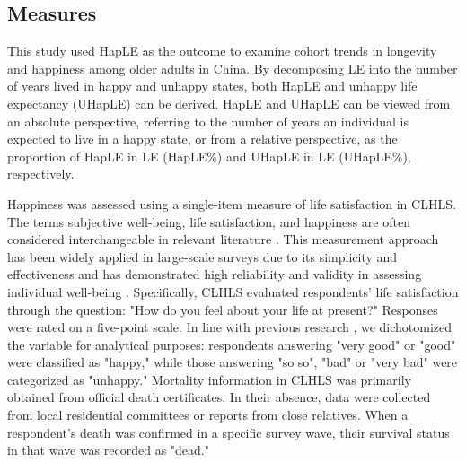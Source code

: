 \documentclass[12pt, a4paper]{article}
\begin{document}
\subsection{Measures}
This study used HapLE as the outcome to examine cohort trends in longevity and happiness among older adults in China. By decomposing LE into the number of years lived in happy and unhappy states, both HapLE and unhappy life expectancy (UHapLE) can be derived. HapLE and UHapLE can be viewed from an absolute perspective, referring to the number of years an individual is expected to live in a happy state, or from a relative perspective, as the proportion of HapLE in LE (HapLE\%) and UHapLE in LE (UHapLE\%), respectively.

Happiness was assessed using a single-item measure of life satisfaction in CLHLS. The terms subjective well-being, life satisfaction, and happiness are often considered interchangeable in relevant literature \autocite{easterlin.2021.growth,yang.2008.long}. This measurement approach has been widely applied in large-scale surveys due to its simplicity and effectiveness and has demonstrated high reliability and validity in assessing individual well-being \autocite{baur.1983.stability,lucas.2018.shortterm}. Specifically, CLHLS evaluated respondents' life satisfaction through the question: "How do you feel about your life at present?" Responses were rated on a five-point scale. In line with previous research \autocite{duan.2020.happy,wan.2024.socioeconomic}, we dichotomized the variable for analytical purposes: respondents answering "very good" or "good" were classified as "happy," while those answering "so so", "bad" or "very bad" were categorized as "unhappy." Mortality information in CLHLS was primarily obtained from official death certificates. In their absence, data were collected from local residential committees or reports from close relatives. When a respondent's death was confirmed in a specific survey wave, their survival status in that wave was recorded as "dead."
\end{document}
